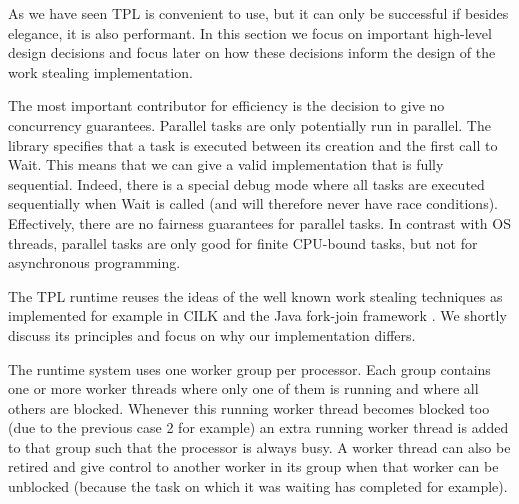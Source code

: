 As we have seen TPL is convenient to use, but it can only be
successful if besides elegance, it is also performant. In this section
we focus on important high-level design decisions and focus later on
how these decisions inform the design of the work stealing
implementation.


The most important contributor for efficiency is the decision to give
no concurrency guarantees. Parallel tasks are only potentially run in
parallel. The library specifies that a task is executed between its
creation and the first call to Wait. This means that we can give a
valid implementation that is fully sequential. Indeed, there is a
special debug mode where all tasks are executed sequentially when Wait
is called (and will therefore never have race
conditions). Effectively, there are no fairness guarantees for
parallel tasks. In contrast with OS threads, parallel tasks are only
good for finite CPU-bound tasks, but not for asynchronous programming.


The TPL runtime reuses the ideas of the well known work stealing
techniques as implemented for example in CILK \cite{Frigo1998,
  Danaher2005} and the Java fork-join framework \cite{Lea2000,
  Lea2000a, Lea2004, Lea2006}. We shortly discuss its principles and
focus on why our implementation differs.

The runtime system uses one worker group per processor. Each group
contains one or more worker threads where only one of them is running
and where all others are blocked. Whenever this running worker thread
becomes blocked too (due to the previous case 2 for example) an extra
running worker thread is added to that group such that the processor
is always busy. A worker thread can also be retired and give control
to another worker in its group when that worker can be unblocked
(because the task on which it was waiting has completed for example).

